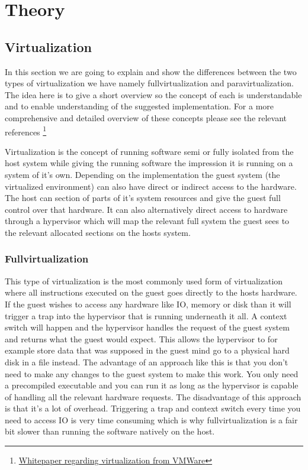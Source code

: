 \section{Theory}

\subsection{Virtualization} 
\label{theory:virtualization}

In this section we are going to explain and show the differences between the two types of virtualization we have namely fullvirtualization and paravirtualization. The idea here is to give a short overview so the concept of each is understandable and to enable understanding of the suggested implementation. For a more comprehensive and detailed overview of these concepts please see the relevant references \footnote{ \href{https://www.vmware.com/content/dam/digitalmarketing/vmware/en/pdf/techpaper/VMware_paravirtualization.pdf}{Whitepaper regarding virtualization from VMWare}}

Virtualization is the concept of running software semi or fully isolated from the host system while giving the running software the impression it is running on a system of it’s own. Depending on the implementation the guest system (the virtualized environment) can also have direct or indirect access to the hardware. The host can section of parts of it’s system resources and give the guest full control over that hardware. It can also alternatively direct access to hardware through a hypervisor which will map the relevant full system the guest sees to the relevant allocated sections on the hosts system.

\subsubsection{Fullvirtualization}
\label{theory:fullvirtualization}

This type of virtualization is the most commonly used form of virtualization where all instructions executed on the guest goes directly to the hosts hardware. If the guest wishes to access any hardware like IO, memory or disk than it will trigger a trap into the hypervisor that is running underneath it all. A context switch will happen and the hypervisor handles the request of the guest system and returns what the guest would expect. This allows the hypervisor to for example store data that was supposed in the guest mind go to a physical hard disk in a file instead. The advantage of an approach like this is that you don’t need to make any changes to the guest system to make this work. You only need a precompiled executable and you can run it as long as the hypervisor is capable of handling all the relevant hardware requests. The disadvantage of this approach is that it’s a lot of overhead. Triggering a trap and context switch every time you need to access IO is very time consuming which is why fullvirtualization is a fair bit slower than running the software natively on the host.

